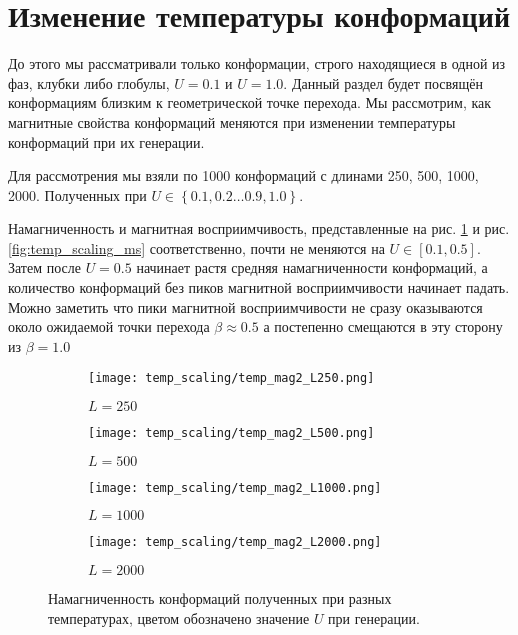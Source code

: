 \section{Изменение температуры конформаций}
До этого мы рассматривали только конформации, строго находящиеся в одной из фаз, клубки либо глобулы, $U = 0.1$ и $U = 1.0$. Данный раздел будет посвящён конформациям близким к геометрической точке перехода. Мы рассмотрим, как магнитные свойства конформаций меняются при изменении температуры конформаций при их генерации. 

Для рассмотрения мы взяли по 1000 конформаций с длинами 250, 500, 1000, 2000. Полученных при $U \in \left\{0.1, 0.2 \dots 0.9, 1.0\right\}$.

Намагниченность и магнитная восприимчивость, представленные на рис. \ref{fig:temp_scaling_mag2} и рис. \ref{fig:temp_scaling_ms} соответственно, почти не меняются на  $U \in \left[0.1, 0.5\right]$. Затем после $U=0.5$ начинает растя средняя намагниченности конформаций, а количество конформаций без пиков магнитной восприимчивости начинает падать.
Можно заметить что пики магнитной восприимчивости не сразу оказываются около ожидаемой точки перехода $\beta \approx 0.5$ а постепенно смещаются в эту сторону из $\beta = 1.0$
\begin{figure}[ht]
	\centering
    \begin{subfigure}[t]{0.4\textwidth}
        \texttt{[image: temp\_scaling/temp\_mag2\_L250.png]}
        \caption*{$L = 250$}
    \end{subfigure} 
    \begin{subfigure}[t]{0.4\textwidth}
        \texttt{[image: temp\_scaling/temp\_mag2\_L500.png]}
        \caption*{$L = 500$}

    \end{subfigure}
    \begin{subfigure}[t]{0.4\textwidth}
        \texttt{[image: temp\_scaling/temp\_mag2\_L1000.png]}
        \caption*{$L = 1000$}
    \end{subfigure}
    \begin{subfigure}[t]{0.4\textwidth}
        \texttt{[image: temp\_scaling/temp\_mag2\_L2000.png]}
        \caption*{$L = 2000$}
    \end{subfigure}
	\caption{Намагниченность конформаций полученных при разных температурах, цветом обозначено значение $U$ при генерации.}
	\label{fig:temp_scaling_mag2}
\end{figure}


